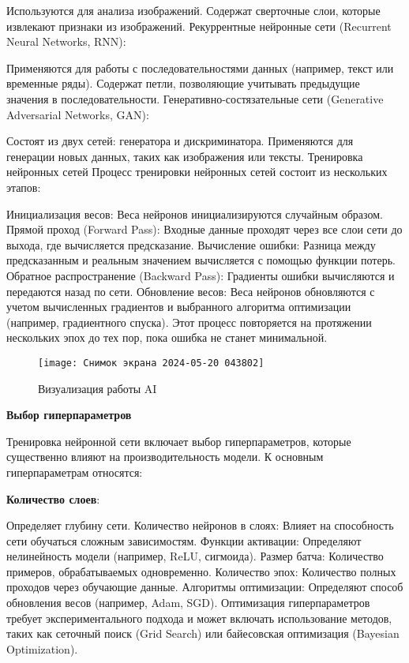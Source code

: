 \documentclass[12pt,a4paper]{article}
\begin{document}
Используются для анализа изображений.
Содержат сверточные слои, которые извлекают признаки из изображений.
Рекуррентные нейронные сети (Recurrent Neural Networks, RNN):

Применяются для работы с последовательностями данных (например, текст или временные ряды).
Содержат петли, позволяющие учитывать предыдущие значения в последовательности.
Генеративно-состязательные сети (Generative Adversarial Networks, GAN):

Состоят из двух сетей: генератора и дискриминатора.
Применяются для генерации новых данных, таких как изображения или тексты.
Тренировка нейронных сетей
Процесс тренировки нейронных сетей состоит из нескольких этапов:

Инициализация весов: Веса нейронов инициализируются случайным образом.
Прямой проход (Forward Pass): Входные данные проходят через все слои сети до выхода, где вычисляется предсказание.
Вычисление ошибки: Разница между предсказанным и реальным значением вычисляется с помощью функции потерь.
Обратное распространение (Backward Pass): Градиенты ошибки вычисляются и передаются назад по сети.
Обновление весов: Веса нейронов обновляются с учетом вычисленных градиентов и выбранного алгоритма оптимизации (например, градиентного спуска).
Этот процесс повторяется на протяжении нескольких эпох до тех пор, пока ошибка не станет минимальной.
\newpage
\begin{figure}[!h]
\centering
\texttt{[image: Снимок экрана 2024-05-20 043802]}
\caption{Визуализация работы AI}
\label{fig:example}
\end{figure}

\item \textbf{Выбор гиперпараметров}

Тренировка нейронной сети включает выбор гиперпараметров, которые существенно влияют на производительность модели. К основным гиперпараметрам относятся:

\item \textbf{Количество слоев}: 

Определяет глубину сети.
Количество нейронов в слоях: Влияет на способность сети обучаться сложным зависимостям.
Функции активации: Определяют нелинейность модели (например, ReLU, сигмоида).
Размер батча: Количество примеров, обрабатываемых одновременно.
Количество эпох: Количество полных проходов через обучающие данные.
Алгоритмы оптимизации: Определяют способ обновления весов (например, Adam, SGD).
Оптимизация гиперпараметров требует экспериментального подхода и может включать использование методов, таких как сеточный поиск (Grid Search) или байесовская оптимизация (Bayesian Optimization).
\end{document}
